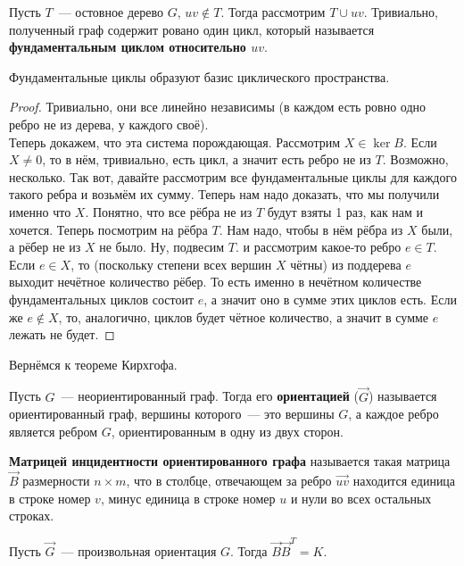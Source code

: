 \documentclass{article}
\begin{document}
    \begin{definition}
        Пусть $T$~--- остовное дерево $G$, $uv\notin T$. Тогда рассмотрим $T\cup uv$. Тривиально, полученный граф содержит ровано один цикл, который называется \textbf{фундаментальным циклом относительно $uv$}.
    \end{definition}
    \begin{theorem}
        Фундаментальные циклы образуют базис циклического пространства.
    \end{theorem}
    \begin{proof}
        Тривиально, они все линейно независимы (в каждом есть ровно одно ребро не из дерева, у каждого своё).\\
        Теперь докажем, что эта система порождающая. Рассмотрим $X\in\ker B$. Если $X\neq0$, то в нём, тривиально, есть цикл, а значит есть ребро не из $T$. Возможно, несколько. Так вот, давайте рассмотрим все фундаментальные циклы для каждого такого ребра и возьмём их сумму. Теперь нам надо доказать, что мы получили именно что $X$. Понятно, что все рёбра не из $T$ будут взяты 1 раз, как нам и хочется. Теперь посмотрим на рёбра $T$. Нам надо, чтобы в нём рёбра из $X$ были, а рёбер не из $X$ не было. Ну, подвесим $T$. и рассмотрим какое-то ребро $e\in T$. Если $e\in X$, то (поскольку степени всех вершин $X$ чётны) из поддерева $e$ выходит нечётное количество рёбер. То есть именно в нечётном количестве фундаментальных циклов состоит $e$, а значит оно в сумме этих циклов есть. Если же $e\notin X$, то, аналогично, циклов будет чётное количество, а значит в сумме $e$ лежать не будет.
    \end{proof}
    \begin{remark}
        Вернёмся к теореме Кирхгофа.
    \end{remark}
    \begin{definition}
        Пусть $G$~--- неориентированный граф. Тогда его \textbf{ориентацией} ($\vec G$) называется ориентированный граф, вершины которого~--- это вершины $G$, а каждое ребро является ребром $G$, ориентированным в одну из двух сторон.
    \end{definition}
    \begin{definition}
        \textbf{Матрицей инцидентности ориентированного графа} называется такая матрица $\vec B$ размерности $n\times m$, что в столбце, отвечающем за ребро $\vec{uv}$ находится единица в строке номер $v$, минус единица в строке номер $u$ и нули во всех остальных строках.
    \end{definition}
    \begin{lemma}
        Пусть $\vec G$~--- произвольная ориентация $G$. Тогда $\vec B\vec B^T=K$.
    \end{lemma}
\end{document}
